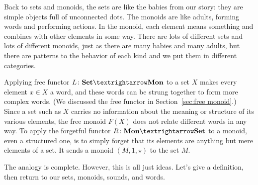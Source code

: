 \documentclass[../main/CT4S-EN-RU]{subfiles}
\begin{document}
\begin{blockRUS}
\end{blockRUS}

\begin{blockENG}
Back to sets and monoids, the sets are like the babies from our story: they are simple objects full of unconnected dots. The monoids are like adults, forming words and performing actions. In the monoid, each element means something and combines with other elements in some way. There are lots of different sets and lots of different monoids, just as there are many babies and many adults, but there are patterns to the behavior of each kind and we put them in different categories.
\end{blockENG}

\begin{blockRUS}
\end{blockRUS}

\begin{blockENG}
Applying free functor $L\colon\Set{→}\Mon$ to a set $X$ makes every element $x\in X$ a word, and these words can be strung together to form more complex words. (We discussed the free functor in Section~\ref{sec:free monoid}.) Since a set such as $X$ carries no information about the meaning or structure of its various elements, the free monoid $F(X)$ does not relate different words in any way. To apply the forgetful functor $R\colon\Mon{→}\Set$ to a monoid, even a structured one, is to simply forget that its elements are anything but mere elements of a set. It sends a monoid $(M,1,{⋆})$ to the set $M.$ 
\end{blockENG}

\begin{blockRUS}
\end{blockRUS}

\begin{blockENG}
The analogy is complete. However, this is all just ideas. Let's give a definition, then return to our sets, monoids, sounds, and words.
\end{blockENG}

\begin{blockRUS}
\end{blockRUS}
\end{document}
